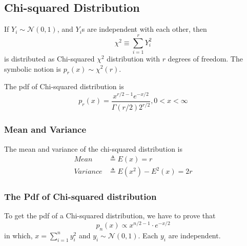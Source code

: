 \subsection{Chi-squared Distribution}
If $Y_i \sim \mathcal{N}(0, 1)$, and $Y_i$s are independent with each other, then
\begin{equation}
    \chi^2 \equiv \sum_{i = 1}^{r} Y_i^2
\end{equation}
is distributed as Chi-squared \emph{$\chi^2$} distribution with $r$ degrees of freedom.
The symbolic notion is $p_r(x) \sim \chi^2(r)$.

The pdf of Chi-squared distribution is
\begin{equation}
    \label{Equation: Pdf of Chi-squared Distribution}
    p_r(x) = \frac{x^{r/2-1} e^{-x/2}}{\Gamma(r/2) 2^{r/2}}, 0 < x < \infty
\end{equation}

\subsubsection{Mean and Variance}

The mean and variance of the chi-squared distribution is
\begin{align*}
    Mean     & \triangleq E(x) = r             \\
    Variance & \triangleq E(x^2) - E^2(x) = 2r
\end{align*}

\subsubsection{The Pdf of Chi-squared distribution}
\begin{lemma}
    \label{lemma: Compute the pdf of Chi-squared distribution}
    To get the pdf of a Chi-squared distribution, we have to prove that
    \begin{equation*}
        p_{n}(x) \propto x^{n/2-1} \cdot e^{-x/2}
    \end{equation*}
    in which, $x = \sum_{i=1}^{n} y_i^2$ and $y_i \sim \mathcal{N}(0, 1)$.
    Each $y_i$ are independent.

\end{lemma}

